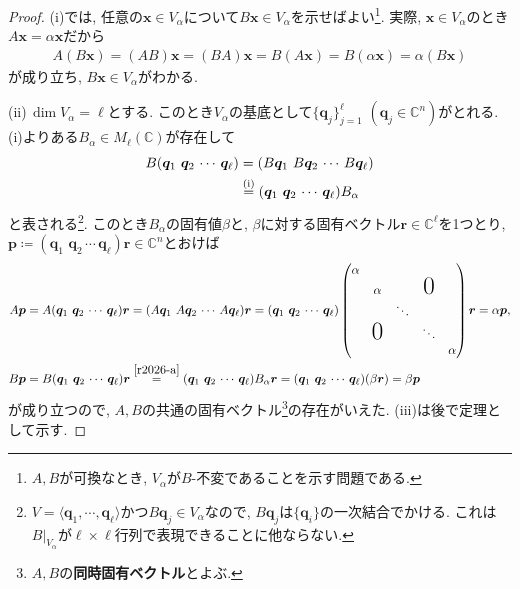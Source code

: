 \documentclass[titlepage]{jsarticle}
\numberwithin{equation}{section}
\newcommand{\C}{\mathbb{C}}%
\begin{document}
\begin{proof}
(i)では, 任意の$\bm{x} \in V_\alpha$について$B\bm{x} \in V_\alpha$を示せばよい\footnote{$A, B$が可換なとき, $V_\alpha$が$B$-不変であることを示す問題である.}. 実際, $\bm{x} \in V_\alpha$のとき$A\bm{x} = \alpha\bm{x}$だから
\begin{align*}
A(B\bm{x}) = (AB)\bm{x} = (BA)\bm{x} = B(A\bm{x}) = B(\alpha\bm{x}) = \alpha (B\bm{x})
\end{align*}
が成り立ち, $B\bm{x} \in V_\alpha$がわかる.

(ii)\,$\dim V_\alpha = \ell$とする. このとき$V_\alpha$の基底として$\displaystyle{\{\bm{q}_j\}_{j = 1}^\ell}\,\,(\bm{q}_j \in \C^n)$がとれる. (i)よりある$B_\alpha \in M_\ell(\C)$が存在して
\begin{align}
B(\bm{q}_1\,\,\bm{q}_2\, \cdots \, \bm{q}_\ell) &=  (B\bm{q}_1\,\,B\bm{q}_2\, \cdots \, B\bm{q}_\ell) \notag \\
&\stackrel{(\text{i})}{=} (\bm{q}_1\,\,\bm{q}_2\, \cdots \, \bm{q}_\ell)B_\alpha \label{r2026-a}
\end{align}
と表される\footnote{$V=\langle \bm{q}_1, \cdots, \bm{q}_\ell \rangle$かつ$B\bm{q}_j \in V_\alpha$なので, $B\bm{q}_j$は$\{\bm{q}_i\}$の一次結合でかける. これは$B|_{V_\alpha}$が$\ell \times \ell$行列で表現できることに他ならない.}. このとき$B_\alpha$の固有値$\beta$と, $\beta$に対する固有ベクトル$\bm{r} \in \C^\ell$を1つとり, $\bm{p} \coloneq (\bm{q}_1\,\,\bm{q}_2\, \cdots \, \bm{q}_\ell)\bm{r} \in \C^n$とおけば
\begin{align*}
A\bm{p} &= A (\bm{q}_1\,\,\bm{q}_2\, \cdots \, \bm{q}_\ell)\bm{r}  =  (A\bm{q}_1\,\,A\bm{q}_2\, \cdots \, A\bm{q}_\ell) \bm{r} =
 (\bm{q}_1\,\,\bm{q}_2\, \cdots \, \bm{q}_\ell)
\begin{pmatrix}
\alpha                                                            \\
         & \alpha            &        & \text{\huge{0}}   \\
         &                      & \ddots                       \\
         & \text{\huge{0}} &        & \ddots             \\
         &                      &        &           & \alpha
\end{pmatrix}
\bm{r} = \alpha\bm{p},\\
B\bm{p} &= B(\bm{q}_1\,\,\bm{q}_2\, \cdots \, \bm{q}_\ell)\bm{r} \stackrel{\eqref{r2026-a}}{=} (\bm{q}_1\,\,\bm{q}_2\, \cdots \, \bm{q}_\ell)B_\alpha\bm{r}= (\bm{q}_1\,\,\bm{q}_2\, \cdots \, \bm{q}_\ell)(\beta\bm{r}) = \beta\bm{p}
\end{align*}
が成り立つので, $A, B$の共通の固有ベクトル\footnote{$A, B$の\textbf{同時固有ベクトル}とよぶ.}の存在がいえた. (iii)は後で定理として示す.
\end{proof}
\end{document}
